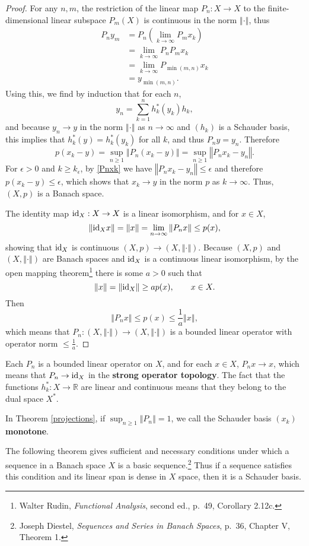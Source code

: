 \documentclass{article}
\newcommand{\id}{\ensuremath\mathrm{id}}
\newcommand{\norm}[1]{\left\Vert #1 \right\Vert}
\theoremstyle{definition}
\begin{document}
\begin{proof}
For any $n,m$, the restriction of the linear map $P_n:X \to X$ to the finite-dimensional linear subspace $P_m(X)$ is
continuous in the norm $\norm{\cdot}$,
thus
\begin{align*}
P_n y_m &=P_n\left( \lim_{k \to \infty} P_m x_k\right)\\
&=\lim_{k \to \infty} P_n P_m x_k\\
&=\lim_{k \to \infty} P_{\min(m,n)} x_k\\
&=y_{\min(m,n)}.
\end{align*}
Using this, we find by induction that for each $n$,
\[
y_n = \sum_{k=1}^n h_k^*(y_k) h_k,
\]
and because $y_n \to y$ in the norm $\norm{\cdot}$ as $n \to \infty$ and $(h_k)$ is a Schauder basis,
this implies that $h_k^*(y)=h_k^*(y_k)$ for all $k$, and thus $P_n y=y_n$. 
Therefore
\[
p(x_k-y) = \sup_{n \geq 1} \norm{P_n(x_k-y)}
= \sup_{n \geq 1} \norm{P_n x_k-y_n}.
\]
For $\epsilon>0$ and $k \geq k_\epsilon$, by \eqref{Pnxk} we have $\norm{P_n x_k-y_n} \leq \epsilon$
and therefore
$p(x_k-y) \leq \epsilon$, which shows that $x_k \to y$ in the norm $p$ as $k \to \infty$. Thus,
$(X,p)$ is a Banach space. 

The identity map $\id_X:X \to X$ is a linear isomorphism, and
for $x \in X$,
\[
\norm{\id_X x} = \norm{x} = \lim_{n \to \infty} \norm{P_n x}
\leq p(x),
\]
showing that $\id_X$ is continuous $(X,p) \to (X,\norm{\cdot})$. 
Because $(X,p)$ and $(X,\norm{\cdot})$ are Banach spaces and
$\id_X$ is a continuous linear isomorphism, by the open mapping theorem\footnote{Walter Rudin,
{\em Functional Analysis}, second ed., p.~49, Corollary 2.12c.}
there is some $a>0$ such that
\[
\norm{x}=\norm{\id_X} \geq ap(x),\qquad x \in X.
\]
Then
\[
\norm{P_n x} \leq p(x) \leq \frac{1}{a} \norm{x},
\]
which means that $P_n:(X,\norm{\cdot}) \to (X,\norm{\cdot})$ is a bounded linear operator with
operator norm $\leq \frac{1}{a}$. 
\end{proof}

Each $P_n$ is a bounded linear operator on $X$, and for each $x \in X$, $P_nx \to x$, which means
that $P_n \to \id_X$ in the \textbf{strong operator topology}. 
The fact that the functions $h_k^*:X \to \mathbb{R}$ are linear and continuous means that they belong to the dual
space
$X^*$. 

In Theorem \ref{projections}, if $\sup_{n \geq 1} \norm{P_n}=1$, we call the Schauder basis $(x_k)$  \textbf{monotone}. 



The following theorem gives sufficient and necessary conditions under which a sequence in a Banach space $X$ is a basic sequence.\footnote{Joseph Diestel, {\em Sequences and Series in Banach Spaces}, p.~36, Chapter V, Theorem 1.} Thus if a sequence satisfies this condition and its linear span is dense in $X$
space, then it is a Schauder basis.
\end{document}

